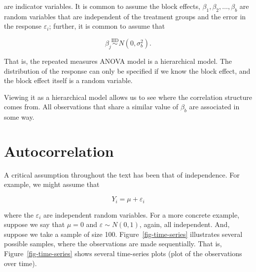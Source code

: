 \documentclass[
  letterpaper,
  DIV=11,
  numbers=noendperiod]{scrreprt}
\theoremstyle{definition}
\theoremstyle{plain}
\theoremstyle{definition}
\theoremstyle{remark}
\begin{document}
are indicator variables. It is common to assume the block effects,
\(\beta_1, \beta_2, \dotsc, \beta_b\) are random variables that are
independent of the treatment groups and the error in the response
\(\varepsilon_i\); further, it is common to assume that

\[\beta_j \stackrel{\text{IID}}{\sim} N\left(0, \sigma^2_b\right).\]

That is, the repeated measures ANOVA model is a hierarchical model. The
distribution of the response can only be specified if we know the block
effect, and the block effect itself is a random variable.

Viewing it as a hierarchical model allows us to see where the
correlation structure comes from. All observations that share a similar
value of \(\beta_b\) are associated in some way.


\chapter{Autocorrelation}\label{sec-autocorrelation}

\providecommand{\norm}[1]{\left\lVert#1\right\rVert}
\providecommand{\abs}[1]{\left\lvert#1\right\rvert}
\providecommand{\dist}[1]{\stackrel{\text{#1}}{\sim}}
\providecommand{\ind}[1]{\mathbb{I}\left(#1\right)}
\providecommand{\bm}[1]{\mathbf{#1}}
\providecommand{\bs}[1]{\boldsymbol{#1}}
\providecommand{\Ell}{\mathcal{L}}
\providecommand{\indep}{\perp\negthickspace\negmedspace\perp}

A critical assumption throughout the text has been that of independence.
For example, we might assume that

\[Y_i = \mu + \varepsilon_i\]

where the \(\varepsilon_i\) are independent random variables. For a more
concrete example, suppose we say that \(\mu = 0\) and
\(\varepsilon \sim N(0, 1)\), again, all independent. And, suppose we
take a sample of size 100. Figure~\ref{fig-time-series} illustrates
several possible samples, where the observations are made sequentially.
That is, Figure~\ref{fig-time-series} shows several time-series plots
(plot of the observations over time).
\end{document}
